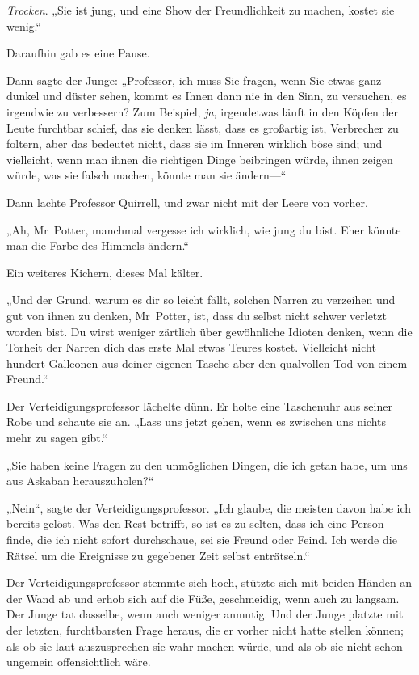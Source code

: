 {\emph{Trocken}. „Sie ist jung, und eine Show der Freundlichkeit zu machen, kostet sie wenig.“

Daraufhin gab es eine Pause.

Dann sagte der Junge: „Professor, ich muss Sie fragen, wenn Sie etwas ganz dunkel und düster sehen, kommt es Ihnen dann nie in den Sinn, zu versuchen, es irgendwie zu verbessern? Zum Beispiel, \emph{ja}, irgendetwas läuft in den Köpfen der Leute furchtbar schief, das sie denken lässt, dass es großartig ist, Verbrecher zu foltern, aber das bedeutet nicht, dass sie im Inneren wirklich böse sind; und vielleicht, wenn man ihnen die richtigen Dinge beibringen würde, ihnen zeigen würde, was sie falsch machen, könnte man sie ändern—“

Dann lachte Professor Quirrell, und zwar nicht mit der Leere von vorher.

„Ah, Mr~Potter, manchmal vergesse ich wirklich, wie jung du bist. Eher könnte man die Farbe des Himmels ändern.“

Ein weiteres Kichern, dieses Mal kälter.

„Und der Grund, warum es dir so leicht fällt, solchen Narren zu verzeihen und gut von ihnen zu denken, Mr~Potter, ist, dass du selbst nicht schwer verletzt worden bist. Du wirst weniger zärtlich über gewöhnliche Idioten denken, wenn die Torheit der Narren dich das erste Mal etwas Teures kostet. Vielleicht nicht hundert Galleonen aus deiner eigenen Tasche aber den qualvollen Tod von einem Freund.“

Der Verteidigungsprofessor lächelte dünn. Er holte eine Taschenuhr aus seiner Robe und schaute sie an. „Lass uns jetzt gehen, wenn es zwischen uns nichts mehr zu sagen gibt.“

„Sie haben keine Fragen zu den unmöglichen Dingen, die ich getan habe, um uns aus Askaban herauszuholen?“

„Nein“, sagte der Verteidigungsprofessor. „Ich glaube, die meisten davon habe ich bereits gelöst. Was den Rest betrifft, so ist es zu selten, dass ich eine Person finde, die ich nicht sofort durchschaue, sei sie Freund oder Feind. Ich werde die Rätsel um die Ereignisse zu gegebener Zeit selbst enträtseln.“

Der Verteidigungsprofessor stemmte sich hoch, stützte sich mit beiden Händen an der Wand ab und erhob sich auf die Füße, geschmeidig, wenn auch zu langsam. Der Junge tat dasselbe, wenn auch weniger anmutig. Und der Junge platzte mit der letzten, furchtbarsten Frage heraus, die er vorher nicht hatte stellen können; als ob sie laut auszusprechen sie wahr machen würde, und als ob sie nicht schon ungemein offensichtlich wäre.

}
